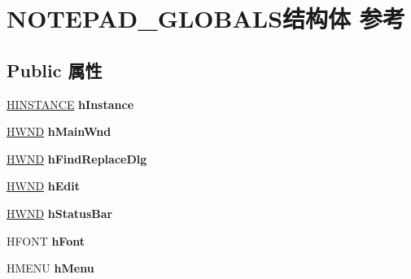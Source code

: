 \hypertarget{struct_n_o_t_e_p_a_d___g_l_o_b_a_l_s}{}\section{N\+O\+T\+E\+P\+A\+D\+\_\+\+G\+L\+O\+B\+A\+L\+S结构体 参考}
\label{struct_n_o_t_e_p_a_d___g_l_o_b_a_l_s}
\subsection*{Public 属性}
\begin{DoxyCompactItemize}
\item 
\mbox{\label{struct_n_o_t_e_p_a_d___g_l_o_b_a_l_s_a9ef23c9bbe119251817877c8764c991d}} 
\hyperlink{interfacevoid}{H\+I\+N\+S\+T\+A\+N\+CE} {\bfseries h\+Instance}
\item 
\mbox{\label{struct_n_o_t_e_p_a_d___g_l_o_b_a_l_s_abf143cb6852dde496b50a63a3b63fc4e}} 
\hyperlink{interfacevoid}{H\+W\+ND} {\bfseries h\+Main\+Wnd}
\item 
\mbox{\label{struct_n_o_t_e_p_a_d___g_l_o_b_a_l_s_a4033a2efd344af10cfcf1054c039aec4}} 
\hyperlink{interfacevoid}{H\+W\+ND} {\bfseries h\+Find\+Replace\+Dlg}
\item 
\mbox{\label{struct_n_o_t_e_p_a_d___g_l_o_b_a_l_s_a29ce49bfa6f19f77a72982890948cbaa}} 
\hyperlink{interfacevoid}{H\+W\+ND} {\bfseries h\+Edit}
\item 
\mbox{\label{struct_n_o_t_e_p_a_d___g_l_o_b_a_l_s_a4aae471c7dbe075a019f0ad5c3644127}} 
\hyperlink{interfacevoid}{H\+W\+ND} {\bfseries h\+Status\+Bar}
\item 
\mbox{\label{struct_n_o_t_e_p_a_d___g_l_o_b_a_l_s_aacc94dd31bd2c1dfc7aaf07e60755420}} 
H\+F\+O\+NT {\bfseries h\+Font}
\item 
\mbox{\label{struct_n_o_t_e_p_a_d___g_l_o_b_a_l_s_a9e86a9d8ada3969a85482770ff925778}} 
H\+M\+E\+NU {\bfseries h\+Menu}
\item 

\end{DoxyCompactItemize}

